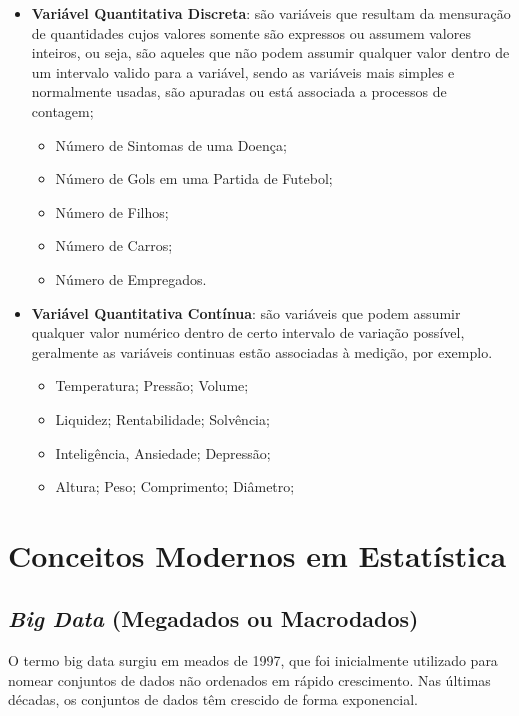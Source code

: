 \begin{itemize}
  \item \textbf{Variável Quantitativa Discreta}: são variáveis que resultam da mensuração de quantidades cujos valores somente são expressos ou assumem valores inteiros, ou seja, são aqueles que não podem assumir qualquer valor dentro de um intervalo valido para a variável, sendo as variáveis mais simples e normalmente usadas, são apuradas ou está associada a processos de contagem;

 \begin{itemize}
   \item Número de Sintomas de uma Doença;
   \item Número de Gols em uma Partida de Futebol;
   \item Número de Filhos;
   \item Número de Carros;
   \item Número de Empregados.
 \end{itemize}
  \item \textbf{Variável Quantitativa Contínua}: são variáveis que podem assumir qualquer valor numérico dentro de certo intervalo de variação possível, geralmente as variáveis continuas estão associadas à medição, por exemplo.
\begin{itemize}
  \item Temperatura; Pressão; Volume;
  \item Liquidez; Rentabilidade; Solvência;
  \item Inteligência, Ansiedade; Depressão;
  \item Altura; Peso; Comprimento; Diâmetro;
\end{itemize}
\end{itemize}



\newpage
\section{Conceitos Modernos em Estatística}

\subsection{\textit{Big Data} (Megadados ou Macrodados)}


O termo big data surgiu em meados de 1997, que foi inicialmente utilizado para nomear conjuntos de dados não ordenados em rápido crescimento. Nas últimas décadas, os conjuntos de dados têm crescido de forma exponencial.


